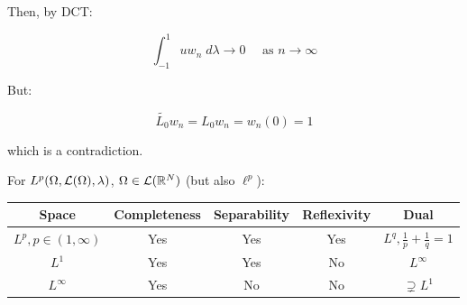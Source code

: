 \begin{fexample}
    Then, by DCT:

    $$\int_{-1}^1 u w_n \; d \lambda \to 0 \quad \text{ as } n \to \infty$$

    But:

    $$\tilde{L_0} w_n = L_0 w_n = w_n(0) = 1$$

    which is a contradiction.

\end{fexample}

\begin{note}[Resuming]
    For $L^p(\Omega, \mathcal{L}(\Omega), \lambda)$, $\Omega \in \mathcal{L}(\mathbb{R}^N)$ (but
    also $\ell^p$):
    \begin{center}
        \begin{tabular}{c|c|c|c|c}
            \textbf{Space} & \textbf{Completeness} & \textbf{Separability} & \textbf{Reflexivity} & \textbf{Dual}\\ \midrule
            $L^p, p \in (1, \infty)$ & Yes & Yes & Yes & $L^q, \frac{1}{p} + \frac{1}{q} = 1$\\ \midrule
            $L^1$ & Yes & Yes & No & $L^{\infty}$ \\ \midrule
            $L^{\infty}$ & Yes & No & No & $\supsetneq L^1$ \\ \bottomrule 
        \end{tabular}
    \end{center}
\end{note}


